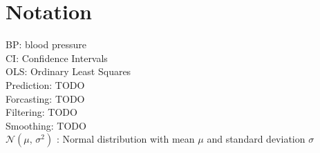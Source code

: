 \chapter*{Notation}
\label{c:Notation}

BP: blood pressure \\
CI: Confidence Intervals\\
OLS: Ordinary Least Squares \\
Prediction: TODO \\
Forcasting: TODO \\
Filtering: TODO \\
Smoothing: TODO \\

$\mathcal{N}(\mu,\,\sigma^{2})$ : Normal distribution with mean $\mu$ and standard deviation $\sigma$




